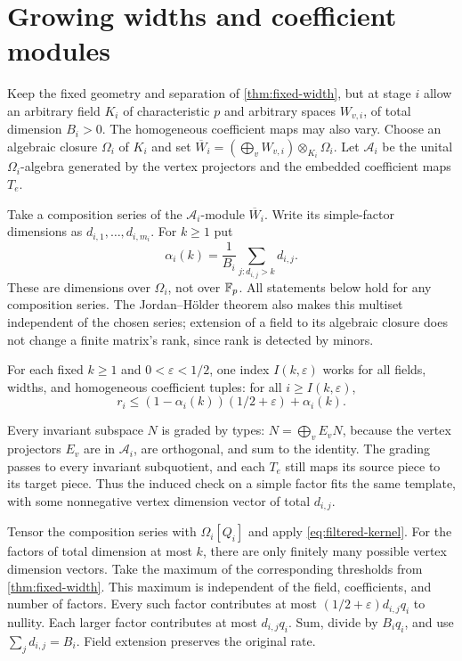 \section{Growing widths and coefficient modules}\label{sec:factors}

Keep the fixed geometry and separation of \cref{thm:fixed-width},
but at stage $i$ allow an arbitrary field $K_i$ of characteristic $p$
and arbitrary spaces $W_{v,i}$, of total dimension $B_i>0$.
The homogeneous coefficient maps may also vary. Choose an algebraic
closure $\Omega_i$ of $K_i$ and set
$\overline W_i=(\bigoplus_vW_{v,i})\otimes_{K_i}\Omega_i$.
Let $\mathcal A_i$ be the unital $\Omega_i$-algebra generated by
the vertex projectors and the embedded coefficient maps $T_e$.

Take a composition series of the $\mathcal A_i$-module
$\overline W_i$. Write its simple-factor dimensions as
$d_{i,1},\ldots,d_{i,m_i}$. For $k\ge1$ put
\begin{equation}\label{eq:factor-mass}
 \alpha_i(k)=\frac1{B_i}\sum_{j:d_{i,j}>k}d_{i,j}.
\end{equation}
These are dimensions over $\Omega_i$, not over $\mathbb{F}_p$.
All statements below hold for any composition series. The
Jordan--H\"older theorem also makes this multiset independent of the
chosen series; extension of a field to its algebraic closure does
not change a finite matrix's rank, since rank is detected by minors.

\begin{theorem}\label{thm:factors}
\notformalized
For each fixed $k\ge1$ and $0<\varepsilon<1/2$, one index
$I(k,\varepsilon)$ works for all fields, widths, and homogeneous
coefficient tuples: for all $i\ge I(k,\varepsilon)$,
\[
 r_i\le(1-\alpha_i(k))(1/2+\varepsilon)+\alpha_i(k).
\]
\end{theorem}
\begin{informalproof}
Every invariant subspace $N$ is graded by types:
$N=\bigoplus_v E_vN$, because the vertex projectors $E_v$ are in
$\mathcal A_i$, are orthogonal, and sum to the identity.
The grading passes to every invariant subquotient, and each $T_e$
still maps its source piece to its target piece. Thus the induced
check on a simple factor fits the same template, with some
nonnegative vertex dimension vector of total $d_{i,j}$.

Tensor the composition series with $\Omega_i[Q_i]$ and apply
\eqref{eq:filtered-kernel}. For the factors of total dimension at
most $k$, there are only finitely many possible vertex dimension
vectors. Take the maximum of the corresponding thresholds from
\cref{thm:fixed-width}. This maximum is independent of the field,
coefficients, and number of factors. Every such factor contributes
at most $(1/2+\varepsilon)d_{i,j}q_i$ to nullity. Each larger factor
contributes at most $d_{i,j}q_i$. Sum, divide by $B_iq_i$, and use
$\sum_jd_{i,j}=B_i$. Field extension preserves the original rate.
\end{informalproof}

